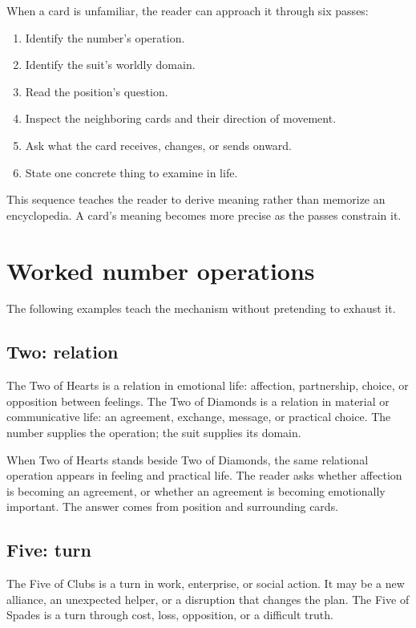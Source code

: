 When a card is unfamiliar, the reader can approach it through six passes:

\begin{enumerate}
\item Identify the number's operation.
\item Identify the suit's worldly domain.
\item Read the position's question.
\item Inspect the neighboring cards and their direction of movement.
\item Ask what the card receives, changes, or sends onward.
\item State one concrete thing to examine in life.
\end{enumerate}

This sequence teaches the reader to derive meaning rather than memorize an
encyclopedia. A card's meaning becomes more precise as the passes constrain it.

\section{Worked number operations}

The following examples teach the mechanism without pretending to exhaust it.

\subsection{Two: relation}

The Two of Hearts is a relation in emotional life: affection, partnership,
choice, or opposition between feelings. The Two of Diamonds is a relation in
material or communicative life: an agreement, exchange, message, or practical
choice. The number supplies the operation; the suit supplies its domain.

When Two of Hearts stands beside Two of Diamonds, the same relational operation
appears in feeling and practical life. The reader asks whether affection is
becoming an agreement, or whether an agreement is becoming emotionally
important. The answer comes from position and surrounding cards.

\subsection{Five: turn}

The Five of Clubs is a turn in work, enterprise, or social action. It may be a
new alliance, an unexpected helper, or a disruption that changes the plan. The
Five of Spades is a turn through cost, loss, opposition, or a difficult truth.

